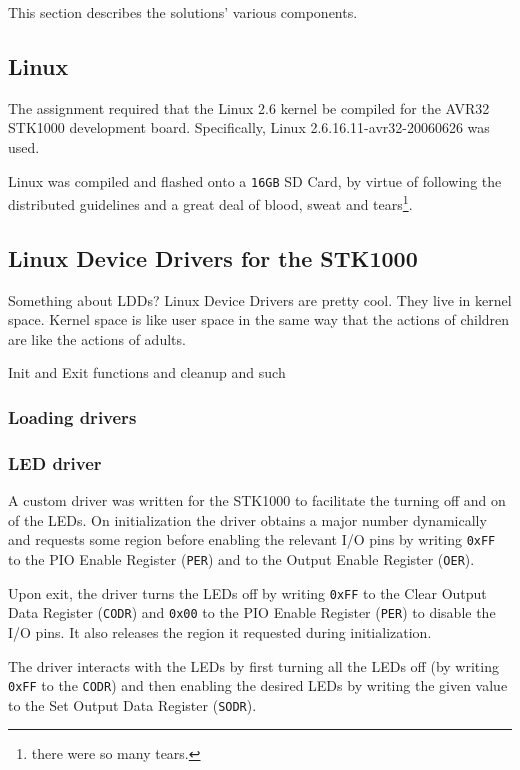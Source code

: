 This section describes the solutions' various components.

\subsection{Linux}
	The assignment required that the Linux 2.6 kernel be compiled for the AVR32 STK1000 development board.
	Specifically, Linux 2.6.16.11-avr32-20060626 was used.

	Linux was compiled and flashed onto a \texttt{16GB} SD Card, by virtue of following the distributed guidelines and a great deal of blood, sweat and tears\footnote{there were so many tears.}.

\subsection{Linux Device Drivers for the STK1000}
	Something about LDDs?
	Linux Device Drivers are pretty cool.
	They live in kernel space.
	Kernel space is like user space in the same way that the actions of children are like the actions of adults.


	Init and Exit functions and cleanup and such

	\subsubsection{Loading drivers}


	\subsubsection{LED driver}
		A custom driver was written for the STK1000 to facilitate the turning off and on of the LEDs.
		On initialization the driver obtains a major number dynamically and requests some region before enabling the relevant I/O pins by writing \texttt{0xFF} to the PIO Enable Register (\texttt{PER}) and to the Output Enable Register (\texttt{OER}).
		
		Upon exit, the driver turns the LEDs off by writing \texttt{0xFF} to the Clear Output Data Register (\texttt{CODR}) and \texttt{0x00} to the PIO Enable Register (\texttt{PER}) to disable the I/O pins.
		It also releases the region it requested during initialization.

		The driver interacts with the LEDs by first turning all the LEDs off (by writing \texttt{0xFF} to the \texttt{CODR}) and then enabling the desired LEDs by writing the given value to the Set Output Data Register (\texttt{SODR}).



